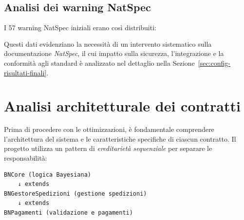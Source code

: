 \subsection{Analisi dei warning NatSpec}

I 57 warning NatSpec iniziali erano così distribuiti:

\begin{table}[H]
\centering
\caption{Breakdown warning NatSpec per tipo}
\end{table}

Questi dati evidenziano la necessità di un intervento sistematico sulla documentazione \textit{NatSpec}, il cui impatto sulla sicurezza, l'integrazione e la conformità agli standard è analizzato nel dettaglio nella Sezione~\ref{sec:config-risultati-finali}.

\section{Analisi architetturale dei contratti}

Prima di procedere con le ottimizzazioni, è fondamentale comprendere l'architettura del sistema e le caratteristiche specifiche di ciascun contratto. Il progetto utilizza un pattern di \textit{ereditarietà sequenziale} per separare le responsabilità:

\begin{verbatim}
BNCore (logica Bayesiana)
    ↓ extends
BNGestoreSpedizioni (gestione spedizioni)
    ↓ extends  
BNPagamenti (validazione e pagamenti)
\end{verbatim}


